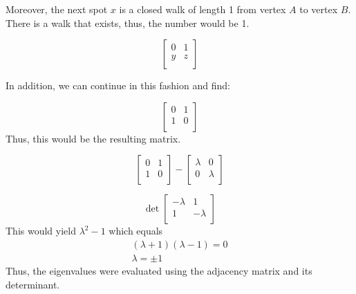 Moreover, the next spot $x$ is a closed walk of length 1 from vertex $A$ to vertex $B$. There is a walk that exists, thus, the number would be 1. 

$$
\begin{bmatrix}
     0        &         1     \\
     y        &         z      \\
\end{bmatrix}
$$

In addition, we can continue in this fashion and find:

$$
\begin{bmatrix}
     0        &         1     \\
     1        &         0      \\
\end{bmatrix}
$$
Thus, this would be the resulting matrix.

\[
\begin{bmatrix}
     0        &         1     \\
     1        &         0      \\
\end{bmatrix}
- 
\begin{bmatrix}
     \lambda        & 0     \\
     0        &         \lambda      \\
\end{bmatrix}
\]


$$
\det\begin{bmatrix}
-\lambda & 1 \\
1 & -\lambda \\
\end{bmatrix}
$$
This would yield $\lambda^2 -1$ which equals \\
\begin{align*}
    (\lambda + 1)(\lambda - 1) =0 \\
    \lambda = \pm 1 
\end{align*}
Thus, the eigenvalues were evaluated using the adjacency matrix and its determinant. 
